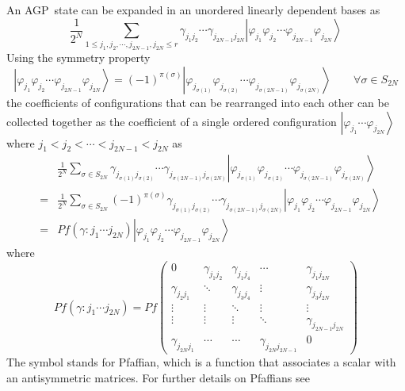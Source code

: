 \documentclass[aps,preprint]{revtex4}
\begin{document}
An AGP\ state can be expanded in an unordered linearly dependent bases as 
\begin{equation}
\frac{1}{2^{N}}\sum_{1\leq j_{1},j_{2},\cdots ,j_{2N-1},j_{2N}\leq r}\gamma
_{j_{1}j_{2}}\cdots \gamma _{j_{2N-1}j_{2N}}\left| \varphi _{j_{1}}\varphi
_{j_{2}}\cdots \varphi _{j_{2N-1}}\varphi _{j_{2N}}\right\rangle
\end{equation}%
Using the symmetry property 
\begin{equation}
\left| \varphi _{j_{1}}\varphi _{j_{2}}\cdots \varphi _{j_{2N-1}}\varphi
_{j_{2N}}\right\rangle =\left( -1\right) ^{\pi \left( \sigma \right) }\left|
\varphi _{j_{\sigma \left( 1\right) }}\varphi _{j_{\sigma \left( 2\right)
}}\cdots \varphi _{j_{\sigma \left( 2N-1\right) }}\varphi _{j_{\sigma \left(
2N\right) }}\right\rangle \qquad \forall \sigma \in S_{2N}
\end{equation}%
the coefficients of configurations that can be rearranged into each other
can be collected together as the coefficient of a single ordered
configuration $\left| \varphi _{j_{1}}\cdots \varphi _{j_{2N}}\right\rangle $
where $j_{1}<j_{2}<\cdots <j_{2N-1}<j_{2N}$ as%
\begin{eqnarray}
&&\frac{1}{2^{N}}\sum_{\sigma \in S_{2N}}\gamma _{j_{\sigma \left( 1\right)
}j_{\sigma \left( 2\right) }}\cdots \gamma _{j_{\sigma \left( 2N-1\right)
}j_{\sigma \left( 2N\right) }}\left| \varphi _{j_{\sigma \left( 1\right)
}}\varphi _{j_{\sigma \left( 2\right) }}\cdots \varphi _{j_{\sigma \left(
2N-1\right) }}\varphi _{j_{\sigma \left( 2N\right) }}\right\rangle  \nonumber
\\
&=&\frac{1}{2^{N}}\sum_{\sigma \in S_{2N}}\left( -1\right) ^{\pi \left(
\sigma \right) }\gamma _{j_{\sigma \left( 1\right) }j_{\sigma \left(
2\right) }}\cdots \gamma _{j_{\sigma \left( 2N-1\right) }j_{\sigma \left(
2N\right) }}\left| \varphi _{j_{1}}\varphi _{j_{2}}\cdots \varphi
_{j_{2N-1}}\varphi _{j_{2N}}\right\rangle  \nonumber \\
&=&Pf\left( \gamma :j_{1}\cdots j_{2N}\right) \left| \varphi _{j_{1}}\varphi
_{j_{2}}\cdots \varphi _{j_{2N-1}}\varphi _{j_{2N}}\right\rangle
\end{eqnarray}%
where 
\begin{equation}
Pf\left( \gamma :j_{1}\cdots j_{2N}\right) =Pf\left( 
\begin{array}{ccccc}
0 & \gamma _{j_{1}j_{2}} & \gamma _{j_{1}j_{4}} & \cdots & \gamma
_{j_{1}j_{2N}} \\ 
\gamma _{j_{2}j_{1}} & \ddots & \gamma _{j_{3}j_{4}} & \vdots & \gamma
_{j_{3}j_{2N}} \\ 
\vdots & \vdots & \ddots & \vdots & \vdots \\ 
\vdots & \vdots & \vdots & \ddots & \gamma _{j_{2N-1}j_{2N}} \\ 
\gamma _{j_{2N}j_{1}} & \cdots & \cdots & \gamma _{j_{2N}j_{2N-1}} & 0%
\end{array}%
\right)
\end{equation}%
The symbol stands for Pfaffian, which is a function that associates a scalar
with an antisymmetric matrices. For further details on Pfaffians see
\end{document}
